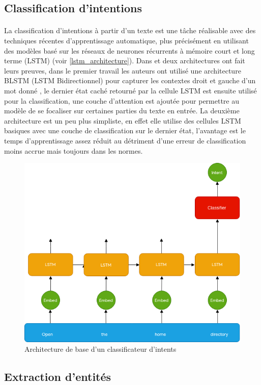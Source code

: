 	\subsection{Classification d'intentions}
		\paragraph{}
		La classification d'intentions à partir d'un texte est une tâche réalisable avec des techniques récentes d'apprentissage automatique, plus précisément en utilisant des modèles basé sur les réseaux de neurones récurrents à mémoire court et long terme (LSTM) (voir \ref{lstm_architecture}). Dans \cite{intent_classification} et \cite{intent_slots} deux architectures ont fait leurs preuves, dans le premier travail les auteurs ont utilisé une architecture BLSTM (LSTM Bidirectionnel) pour capturer les contextes droit et gauche d'un mot donné \cite{blstm}, le dernier état caché retourné par la cellule LSTM est ensuite utilisé pour la classification, une couche d'attention est ajoutée \cite{attention_mechanism} pour permettre au modèle de se focaliser sur certaines parties du texte en entrée. La deuxième architecture est un peu plus simpliste, en effet elle utilise des cellules LSTM basiques avec une couche de classification sur le dernier état, l'avantage est le temps d'apprentissage assez réduit au détriment d'une erreur de classification moins accrue mais toujours dans les normes.
		\begin{figure}[H]
			\centering
			\label{LSTM_intent}
			\includegraphics[width=0.65\linewidth]{images/NLU/intent_classification.png}
			\caption{Architecture de base d'un classificateur d'intents \cite{intent_classification}}
		\end{figure}
	\newpage
	\subsection{Extraction d'entités}
